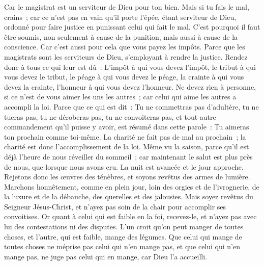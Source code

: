 \begin{multicols}{2}
Car le magistrat est un serviteur de Dieu pour ton bien. Mais si tu fais le mal, crains~; car ce n'est pas en vain qu'il porte l'épée, étant serviteur de Dieu, ordonné pour faire justice en punissant celui qui fait le mal.
C'est pourquoi il faut être soumis, non seulement à cause de la punition, mais aussi à cause de la conscience.
Car c'est aussi pour cela que vous payez les impôts. Parce que les magistrats sont les serviteurs de Dieu, s'employant à rendre la justice.
Rendez donc à tous ce qui leur est dû~: L'impôt à qui vous devez l'impôt, le tribut à qui vous devez le tribut, le péage à qui vous devez le péage, la crainte à qui vous devez la crainte, l'honneur à qui vous devez l'honneur.
Ne devez rien à personne, si ce n'est de vous aimer les uns les autres~; car celui qui aime les autres a accompli la loi.
Parce que ce qui est dit~: Tu ne commettras pas d'adultère, tu ne tueras pas, tu ne déroberas pas, tu ne convoiteras pas, et tout autre commandement qu'il puisse y avoir, est résumé dans cette parole~: Tu aimeras ton prochain comme toi-même.
La charité ne fait pas de mal au prochain~; la charité est donc l'accomplissement de la loi.
Même vu la saison, parce qu'il est déjà l’heure de nous réveiller du sommeil~; car maintenant le salut est plus près de nous, que lorsque nous avons cru.
La nuit est avancée et le jour approche. Rejetons donc les œuvres des ténèbres, et soyons revêtus des armes de lumière.
Marchons honnêtement, comme en plein jour, loin des orgies et de l'ivrognerie, de la luxure et de la débauche, des querelles et des jalousies.
Mais soyez revêtus du Seigneur Jésus-Christ, et n'ayez pas soin de la chair pour accomplir ses convoitises.
\VerseOne{}Or quant à celui qui est faible en la foi, recevez-le, et n'ayez pas avec lui des contestations ni des disputes.
L'un croit qu'on peut manger de toutes choses, et l'autre, qui est faible, mange des légumes.
Que celui qui mange de toutes choses ne méprise pas celui qui n'en mange pas, et que celui qui n'en mange pas, ne juge pas celui qui en mange, car Dieu l'a accueilli.

\end{multicols}
